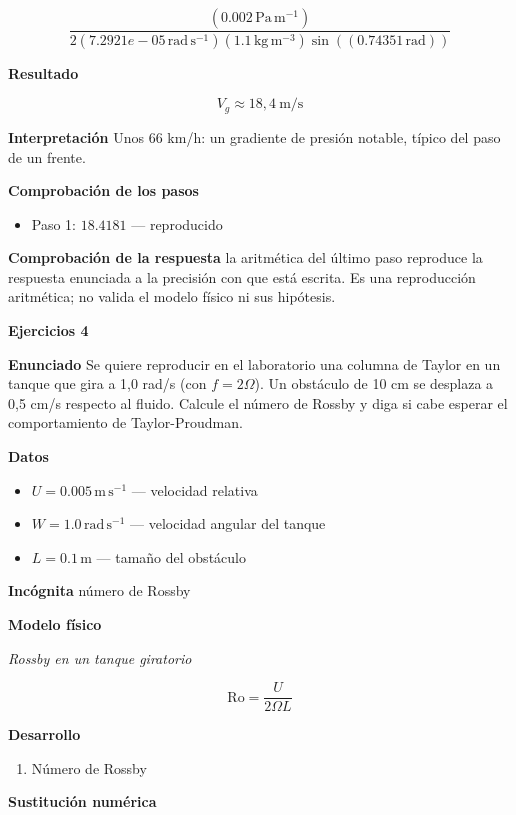 \documentclass[10pt,openany]{book}
\begin{document}
\[
\frac{\left(0.002\,\mathrm{Pa}\,\mathrm{m}^{-1}\right)}{2 \left(7.2921e-05\,\mathrm{rad}\,\mathrm{s}^{-1}\right) \left(1.1\,\mathrm{kg}\,\mathrm{m}^{-3}\right) \sin{\left(\left(0.74351\,\mathrm{rad}\right) \right)}}
\]

\noindent\textbf{Resultado}

\[
V_g \approx 18{,}4\ \mathrm{m/s}
\]

\noindent\textbf{Interpretación}
Unos 66 km/h: un gradiente de presión notable, típico del paso de un frente.

\noindent\textbf{Comprobación de los pasos}
\begin{itemize}
\item Paso 1: $18.4181$ — reproducido
\end{itemize}

\noindent\textbf{Comprobación de la respuesta} la aritmética del último paso reproduce la respuesta enunciada a la precisión con que está escrita. Es una reproducción aritmética; no valida el modelo físico ni sus hipótesis.

\noindent\textbf{Ejercicios 4}

\noindent\textbf{Enunciado}
Se quiere reproducir en el laboratorio una columna de Taylor en un tanque que gira a 1,0 rad/s (con \(f = 2\Omega\)). Un obstáculo de 10 cm se desplaza a 0,5 cm/s respecto al fluido. Calcule el número de Rossby y diga si cabe esperar el comportamiento de Taylor-Proudman.

\noindent\textbf{Datos}
\begin{itemize}
\item $U = 0.005\,\mathrm{m}\,\mathrm{s}^{-1}$ — velocidad relativa
\item $W = 1.0\,\mathrm{rad}\,\mathrm{s}^{-1}$ — velocidad angular del tanque
\item $L = 0.1\,\mathrm{m}$ — tamaño del obstáculo
\end{itemize}

\noindent\textbf{Incógnita}
número de Rossby

\noindent\textbf{Modelo físico}

\noindent\textit{Rossby en un tanque giratorio}

\[
\mathrm{Ro} = \frac{U}{2\Omega L}
\]

\noindent\textbf{Desarrollo}
\begin{enumerate}
\item
Número de Rossby
\end{enumerate}

\noindent\textbf{Sustitución numérica}
\end{document}
